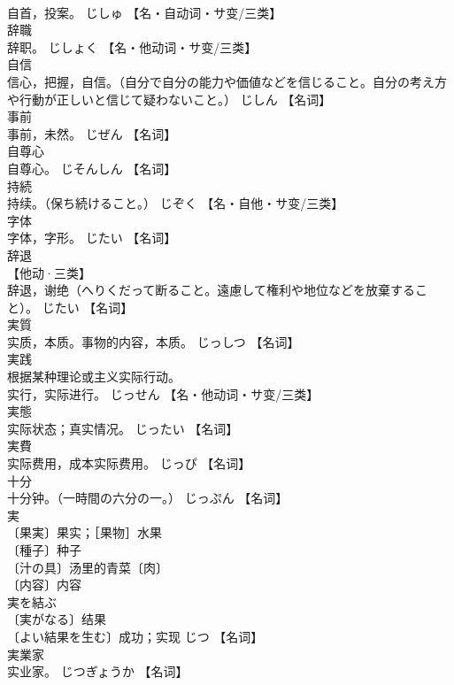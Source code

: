\documentclass[8pt]{extreport}
\begin{document}
\begin{CJK}{UTF8}{min}
\\	自首，投案。	じしゅ		【名・自动词・サ变/三类】
\\	辞職	
\\	辞职。	じしょく		【名・他动词・サ变/三类】
\\	自信	
\\	信心，把握，自信。（自分で自分の能力や価値などを信じること。自分の考え方や行動が正しいと信じて疑わないこと。）	じしん		【名词】
\\	事前	
\\	事前，未然。	じぜん		【名词】
\\	自尊心	
\\	自尊心。	じそんしん		【名词】
\\	持続	
\\	持续。（保ち続けること。）	じぞく		【名・自他・サ变/三类】
\\	字体	
\\	字体，字形。	じたい		【名词】
\\	辞退	
\\	【他动·三类】 
\\	辞退，谢绝（へりくだって断ること。遠慮して権利や地位などを放棄すること）。	じたい		【名词】
\\	実質	
\\	实质，本质。事物的内容，本质。	じっしつ		【名词】
\\	実践	
\\	根据某种理论或主义实际行动。 
\\	实行，实际进行。	じっせん		【名・他动词・サ变/三类】
\\	実態	
\\	实际状态；真实情况。	じったい		【名词】
\\	実費	
\\	实际费用，成本实际费用。	じっぴ		【名词】
\\	十分	
\\	十分钟。（一時間の六分の一。）	じっぷん		【名词】
\\	実	
\\	〔果実〕果实；［果物］水果 
\\	〔種子〕种子 
\\	〔汁の具〕汤里的青菜〔肉〕 
\\	〔内容〕内容 
\\	実を結ぶ 
\\	〔実がなる〕结果 
\\	〔よい結果を生む〕成功；实现	じつ		【名词】
\\	実業家	
\\	实业家。	じつぎょうか		【名词】

\end{CJK}
\end{document}
